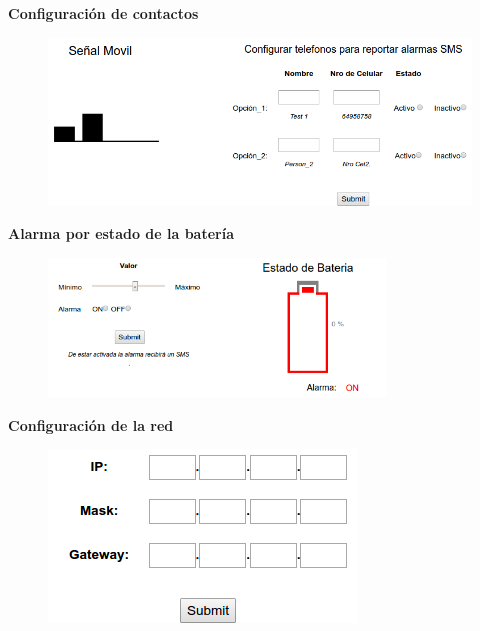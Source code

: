 \documentclass[11pt]{beamer}
\begin{document}
\begin{frame}{\textbf{\LARGE{Configuración de contactos}}}
  \vspace{-.7cm}
  \begin{figure}[H]
    {\includegraphics[width=1\textwidth]{./imagenes/config_Modem.png}}
  \end{figure}	
\end{frame}

\begin{frame}{\textbf{\LARGE{Alarma por estado de la batería}}}
  \vspace{-.7cm}
  \begin{figure}[H]
    {\includegraphics[width=0.8\textwidth]{./imagenes/config_bat.png}}
  \end{figure}	
\end{frame}

\begin{frame}{\textbf{\LARGE{Configuración de la red}}}
  \vspace{-.7cm}
  \begin{figure}[H]
    {\includegraphics[width=.7\textwidth]{./imagenes/config_network.png}}
  \end{figure}	
\end{frame}
\end{document}
